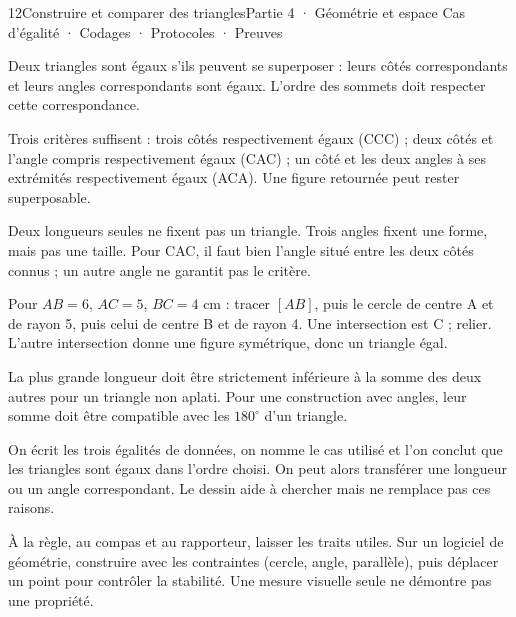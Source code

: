 \begin{ouverture}[geometrie]{12}{Construire et comparer des triangles}{Partie 4 · Géométrie et espace}
{Cas d’égalité · Codages · Protocoles · Preuves}
\end{ouverture}
\pagestyle{otMain}\essentiel\fontsize{11}{15}\selectfont
{}\label{cours-12-1}
\begin{definition}Deux triangles sont égaux s’ils peuvent se superposer : leurs côtés correspondants et leurs angles correspondants sont égaux. L’ordre des sommets doit respecter cette correspondance.\end{definition}
\begin{propriete}Trois critères suffisent : trois côtés respectivement égaux (CCC) ; deux côtés et l’angle compris respectivement égaux (CAC) ; un côté et les deux angles à ses extrémités respectivement égaux (ACA). Une figure retournée peut rester superposable.\end{propriete}
\label{fig-cours-12-1-cours-triangles-egaux}

\begin{attention}Deux longueurs seules ne fixent pas un triangle. Trois angles fixent une forme, mais pas une taille. Pour CAC, il faut bien l’angle situé entre les deux côtés connus ; un autre angle ne garantit pas le critère.\end{attention}
\clearpage
{}\label{cours-12-2}
\begin{savoirfaire}Pour $AB=6$, $AC=5$, $BC=4$ cm : tracer $[AB]$, puis le cercle de centre A et de rayon 5, puis celui de centre B et de rayon 4. Une intersection est C ; relier. L’autre intersection donne une figure symétrique, donc un triangle égal.\end{savoirfaire}
\begin{savoirfaire}La plus grande longueur doit être strictement inférieure à la somme des deux autres pour un triangle non aplati. Pour une construction avec angles, leur somme doit être compatible avec les $180^\circ$ d’un triangle.\end{savoirfaire}
\begin{exemple}On écrit les trois égalités de données, on nomme le cas utilisé et l’on conclut que les triangles sont égaux dans l’ordre choisi. On peut alors transférer une longueur ou un angle correspondant. Le dessin aide à chercher mais ne remplace pas ces raisons.\end{exemple}
\begin{savoirfaire}À la règle, au compas et au rapporteur, laisser les traits utiles. Sur un logiciel de géométrie, construire avec les contraintes (cercle, angle, parallèle), puis déplacer un point pour contrôler la stabilité. Une mesure visuelle seule ne démontre pas une propriété.\end{savoirfaire}

